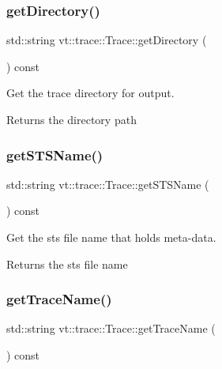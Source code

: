 \subsubsection{\texorpdfstring{get\+Directory()}{getDirectory()}}
{\footnotesize\ttfamily std\+::string vt\+::trace\+::\+Trace\+::get\+Directory (\begin{DoxyParamCaption}{ }\end{DoxyParamCaption}) const\hspace{0.3cm}{\ttfamily [inline]}}



Get the trace directory for output. 

\begin{DoxyReturn}{Returns}
the directory path 
\end{DoxyReturn}
\mbox{\label{structvt_1_1trace_1_1_trace_af92da7879adc530c72945530b0bfa11d}} 
\subsubsection{\texorpdfstring{get\+S\+T\+S\+Name()}{getSTSName()}}
{\footnotesize\ttfamily std\+::string vt\+::trace\+::\+Trace\+::get\+S\+T\+S\+Name (\begin{DoxyParamCaption}{ }\end{DoxyParamCaption}) const\hspace{0.3cm}{\ttfamily [inline]}}



Get the sts file name that holds meta-\/data. 

\begin{DoxyReturn}{Returns}
the sts file name 
\end{DoxyReturn}
\mbox{\label{structvt_1_1trace_1_1_trace_a6825144c1fb635304c957dee8f667b4a}} 
\subsubsection{\texorpdfstring{get\+Trace\+Name()}{getTraceName()}}
{\footnotesize\ttfamily std\+::string vt\+::trace\+::\+Trace\+::get\+Trace\+Name (\begin{DoxyParamCaption}{ }\end{DoxyParamCaption}) const\hspace{0.3cm}{\ttfamily [inline]}}



